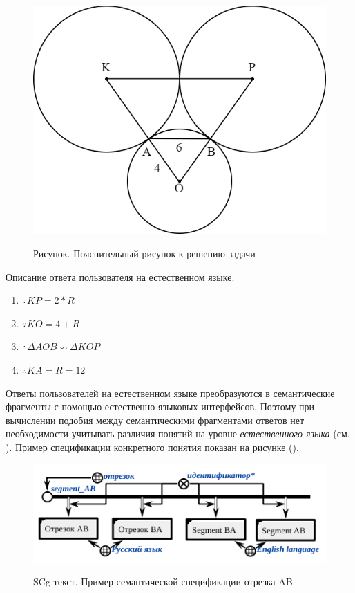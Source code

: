 \begin{figure}[H]
	\caption{Рисунок. Пояснительный рисунок к решению задачи}
	\includegraphics[scale=0.3]{author/part7/figures/explanatory_illustration_example.png}
	\label{fig:EI_example}
\end{figure}

Описание ответа пользователя на естественном языке:

\begin{enumerate}
	\item $\because KP = 2*R$
	\item $\because KO = 4+R$
	\item $\therefore \Delta A O B\backsim \Delta K O P$
	\item $\therefore K A = R = 12$
\end{enumerate}

Ответы пользователей на естественном языке преобразуются в семантические фрагменты с помощью естественно-языковых интерфейсов. Поэтому при вычислении подобия между семантическими фрагментами ответов нет необходимости учитывать различия понятий на уровне \textit{естественного языка} (см. ). Пример спецификации конкретного понятия показан на рисунке (\textit{}).

\begin{figure}[H]
	\caption{SCg-текст. Пример семантической спецификации отрезка AB}
	\includegraphics[scale=0.8]{author/part7/figures/specification_segment_example.png}
	\label{fig:SSE_example}
\end{figure}

